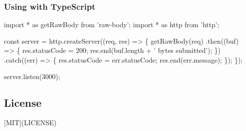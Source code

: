 \subsubsection*{Using with Type\+Script}


\begin{DoxyCode}
import * as getRawBody from 'raw-body';
import * as http from 'http';

const server = http.createServer((req, res) => \{
  getRawBody(req)
  .then((buf) => \{
    res.statusCode = 200;
    res.end(buf.length + ' bytes submitted');
  \})
  .catch((err) => \{
    res.statusCode = err.statusCode;
    res.end(err.message);
  \});
\});

server.listen(3000);
\end{DoxyCode}


\subsection*{License}

\mbox{[}M\+IT\mbox{]}(L\+I\+C\+E\+N\+SE) 